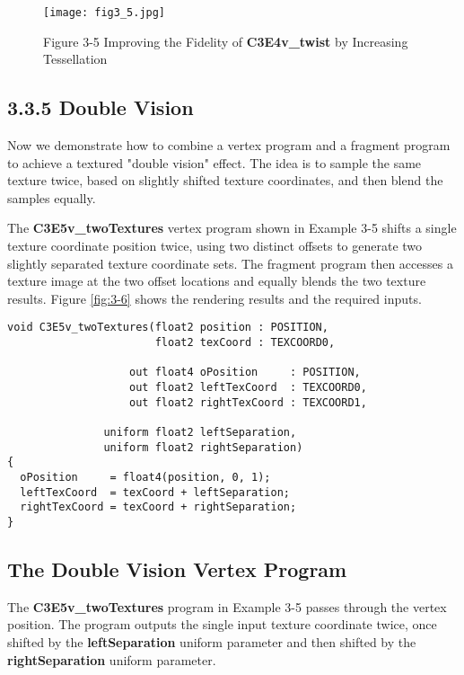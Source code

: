 \documentclass[../main.tex]{subfiles}
\begin{document}
\begin{figure}
    \centering
    \texttt{[image: fig3\_5.jpg]}
    \caption{Figure 3-5 Improving the Fidelity of \textbf{C3E4v_twist} by Increasing Tessellation}
    \label{fig:3-5}
\end{figure}

\subsection{3.3.5 Double Vision}

Now we demonstrate how to combine a vertex program and a fragment program to achieve a textured "double vision" effect. The idea is to sample the same texture twice, based on slightly shifted texture coordinates, and then blend the samples equally.

The \textbf{C3E5v_twoTextures} vertex program shown in Example 3-5 shifts a single texture coordinate position twice, using two distinct offsets to generate two slightly separated texture coordinate sets. The fragment program then accesses a texture image at the two offset locations and equally blends the two texture results. Figure \ref{fig:3-6} shows the rendering results and the required inputs.

\FloatBarrier
\begin{lstlisting}[caption=Example 3-5. The \textbf{C3E5v_twoTextures} Vertex Program]
void C3E5v_twoTextures(float2 position : POSITION,
                       float2 texCoord : TEXCOORD0,

                   out float4 oPosition     : POSITION,
                   out float2 leftTexCoord  : TEXCOORD0,
                   out float2 rightTexCoord : TEXCOORD1,

               uniform float2 leftSeparation,
               uniform float2 rightSeparation)
{
  oPosition     = float4(position, 0, 1);
  leftTexCoord  = texCoord + leftSeparation;
  rightTexCoord = texCoord + rightSeparation;
}
\end{lstlisting}
\FloatBarrier

\subsection*{The Double Vision Vertex Program}

The \textbf{C3E5v_twoTextures} program in Example 3-5 passes through the vertex position. The program outputs the single input texture coordinate twice, once shifted by the \textbf{leftSeparation} uniform parameter and then shifted by the \textbf{rightSeparation} uniform parameter.
\end{document}
